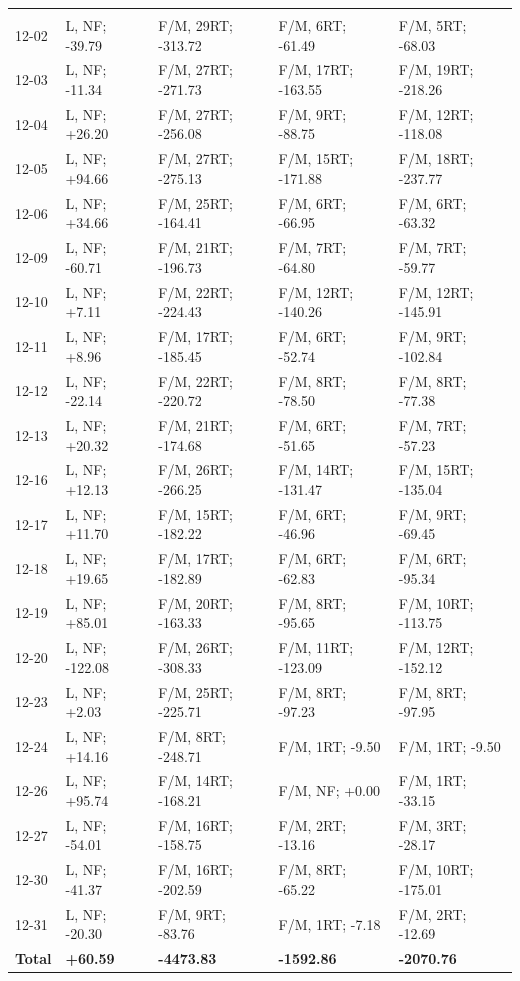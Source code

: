 \begin{table}[H]
\begin{tabular*}{\textwidth}{@{\extracolsep{\fill}} lllll}
\addlinespace[0.25em]
\midrule
\multicolumn{5}{@{}l}{\textbf{December 2024}}\\
12-02 & L, NF; -39.79 & F/M, 29RT; -313.72 & F/M, 6RT; -61.49 & F/M, 5RT; -68.03 \\
12-03 & L, NF; -11.34 & F/M, 27RT; -271.73 & F/M, 17RT; -163.55 & F/M, 19RT; -218.26 \\
12-04 & L, NF; +26.20 & F/M, 27RT; -256.08 & F/M, 9RT; -88.75 & F/M, 12RT; -118.08 \\
12-05 & L, NF; +94.66 & F/M, 27RT; -275.13 & F/M, 15RT; -171.88 & F/M, 18RT; -237.77 \\
12-06 & L, NF; +34.66 & F/M, 25RT; -164.41 & F/M, 6RT; -66.95 & F/M, 6RT; -63.32 \\
12-09 & L, NF; -60.71 & F/M, 21RT; -196.73 & F/M, 7RT; -64.80 & F/M, 7RT; -59.77 \\
12-10 & L, NF; +7.11 & F/M, 22RT; -224.43 & F/M, 12RT; -140.26 & F/M, 12RT; -145.91 \\
12-11 & L, NF; +8.96 & F/M, 17RT; -185.45 & F/M, 6RT; -52.74 & F/M, 9RT; -102.84 \\
12-12 & L, NF; -22.14 & F/M, 22RT; -220.72 & F/M, 8RT; -78.50 & F/M, 8RT; -77.38 \\
12-13 & L, NF; +20.32 & F/M, 21RT; -174.68 & F/M, 6RT; -51.65 & F/M, 7RT; -57.23 \\
12-16 & L, NF; +12.13 & F/M, 26RT; -266.25 & F/M, 14RT; -131.47 & F/M, 15RT; -135.04 \\
12-17 & L, NF; +11.70 & F/M, 15RT; -182.22 & F/M, 6RT; -46.96 & F/M, 9RT; -69.45 \\
12-18 & L, NF; +19.65 & F/M, 17RT; -182.89 & F/M, 6RT; -62.83 & F/M, 6RT; -95.34 \\
12-19 & L, NF; +85.01 & F/M, 20RT; -163.33 & F/M, 8RT; -95.65 & F/M, 10RT; -113.75 \\
12-20 & L, NF; -122.08 & F/M, 26RT; -308.33 & F/M, 11RT; -123.09 & F/M, 12RT; -152.12 \\
12-23 & L, NF; +2.03 & F/M, 25RT; -225.71 & F/M, 8RT; -97.23 & F/M, 8RT; -97.95 \\
12-24 & L, NF; +14.16 & F/M, 8RT; -248.71 & F/M, 1RT; -9.50 & F/M, 1RT; -9.50 \\
12-26 & L, NF; +95.74 & F/M, 14RT; -168.21 & F/M, NF; +0.00 & F/M, 1RT; -33.15 \\
12-27 & L, NF; -54.01 & F/M, 16RT; -158.75 & F/M, 2RT; -13.16 & F/M, 3RT; -28.17 \\
12-30 & L, NF; -41.37 & F/M, 16RT; -202.59 & F/M, 8RT; -65.22 & F/M, 10RT; -175.01 \\
12-31 & L, NF; -20.30 & F/M, 9RT; -83.76 & F/M, 1RT; -7.18 & F/M, 2RT; -12.69 \\
\textbf{Total} & \textbf{+60.59} & \textbf{-4473.83} & \textbf{-1592.86} & \textbf{-2070.76} \\


\end{tabular*}
\end{table}
